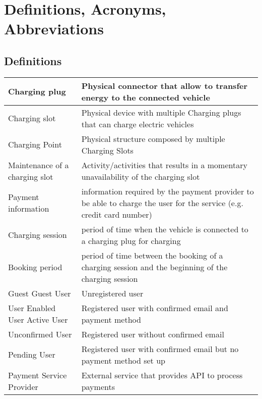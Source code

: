 \section{Definitions, Acronyms, Abbreviations}

\subsection{Definitions}

\begin{tabular}{|p{5cm}|p{10cm}|}
	\hline
	Charging plug & Physical connector that allow to transfer energy to the connected vehicle\\
	\hline
	Charging slot & Physical device with multiple Charging plugs that can charge electric vehicles\\
	\hline
	Charging Point & Physical structure composed by multiple Charging Slots\\
	\hline
	Maintenance of a charging slot & Activity/activities that results in a momentary unavailability of the charging slot\\
	\hline
	Payment information & information required by the payment provider to be able to charge the user for the service (e.g. credit card number)\\
	\hline
	Charging session & period of time when the vehicle is connected to a charging plug for charging\\
	\hline
	Booking period & period of time between the booking of a charging session and the beginning of the charging session\\
	\hline
	{Guest \newline Guest User} & Unregistered user\\
	\hline
	{User \newline Enabled User \newline Active User} & Registered user with confirmed email and payment method\\
	\hline
	Unconfirmed User & Registered user without confirmed email\\
	\hline
	Pending User & Registered user with confirmed email but no payment method set up\\
	\hline
	Payment Service Provider & External service that provides API to process payments\\
	\hline
\end{tabular}

